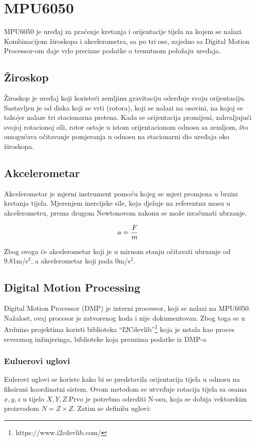 \documentclass[../Document.tex]{subfiles}
\begin{document}
\section{MPU6050} \label{mpu}

MPU6050 je uređaj za praćenje kretanja i orijentacije tijela na kojem se nalazi. Kombinacijom žiroskopa i akcelerometra, sa po tri ose, zajedno sa Digital Motion Processor-om daje vrlo precizne podatke o trenutnom položaju uređaja.

\subsection{Žiroskop}
Žiroskop je uređaj koji koristeći zemljinu gravitaciju oderđuje svoju orijentaciju. Sastavljen je od diska koji se vrti (rotora), koji se nalazi na osovini, na kojoj se tako]er nalaze tri stacionarna prstena. Kada se orijentacija promijeni, zahvaljujući svojoj rotacionoj sili, rotor ostaje u istom orijentacionom odnosu sa zemljom, što omogućava očitavanje pomjeranja u odnosu na stacionarni dio uređaja oko žiroskopa.


\subsection{Akcelerometar}
Akcelerometar je mjerni instrument pomoću kojeg se mjeri promjena u brzini kretanja tijela. Mjerenjem inercijske sile, koja djeluje na referentnu masu u akcelerometru, prema drugom Newtonovom zakonu se može izračunati ubrzanje.

$$
    \centering
    a = \frac{F}{m}
$$

\noindent Zbog ovoga će akcelerometar koji je u mirnom stanju očitavati ubrzanje od 9.81m/s$^2$, a akcelerometar koji pada 0m/s$^2$.

\subsection{Digital Motion Processing}\label{dmp}

Digital Motion Processor (DMP) je interni proceseor, koji se nalazi na MPU6050. Nažalost, ovaj procesor je zatvorenog koda i nije dokumentovan. Zbog toga se u Arduino projektima koristi biblioteka ``I2Cdevlib''\footnote{https://www.i2cdevlib.com/} koja je nstala kao proces reverznog inžinjeringa, biblioteke koja preuzima podatke iz DMP-a

\subsubsection{Euluerovi uglovi}
Eulerovi uglovi se koriste kako bi se predstavila orijentacija tijela u odnosu na fiksirani koordinatni sistem. Ovom metodom se utvrđuje rotacija tijela sa osama $x,y,z$ u tijelo $X,Y,Z$.Prvo je potrebno odrediti N-osu, koja se dobija vektorskim proizvodom $N=Z \times Z$. Zatim se definišu uglovi:
\end{document}
